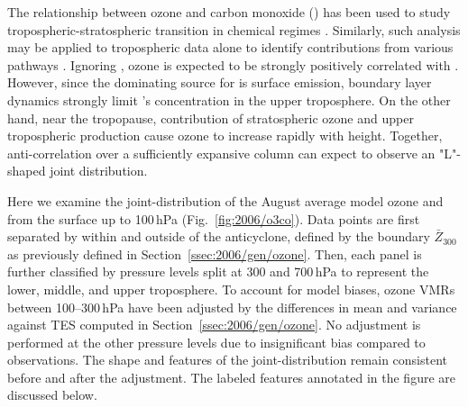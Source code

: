 The relationship between ozone and carbon monoxide () has been used to study tropospheric-stratospheric transition in
chemical regimes \citep[e.g.][and references therein]{Pan:2007sw,Hegglin:2009fk}. Similarly, such analysis may be applied to tropospheric data
alone to identify contributions from various pathways \citep[e.g.][]{Zhang:2006zr,Voulgarakis:2011fk,Cristofanelli:2013uq}. Ignoring
, ozone is expected to be strongly positively correlated with  \citep[][, see also Ch.~\ref{ch:introduction}]{Chin:1994kx}. However, since the dominating
source for  is surface emission, boundary layer dynamics strongly limit 's concentration in the upper troposphere.
On the other hand, near the tropopause, contribution of stratospheric ozone and upper tropospheric production cause ozone to
increase rapidly with height. Together,  anti-correlation over a sufficiently expansive column can expect to observe
an "L"-shaped joint distribution.

Here we examine the joint-distribution of the August average model ozone and  from the surface up to 100\,\unit{hPa} (Fig.~\ref{fig:2006/o3co}).
Data points are first separated by within and outside of the anticyclone, defined by the boundary $\bar{Z}_{300}$ as previously
defined in Section~\ref{ssec:2006/gen/ozone}. Then, each panel is further classified by pressure levels split at 300 and 700\,\unit{hPa}
to represent the lower, middle, and upper troposphere. To account for model biases, ozone VMRs between 100--300\,\unit{hPa}
have been adjusted by the differences in mean and variance against TES computed in Section~\ref{ssec:2006/gen/ozone}. No
adjustment is performed at the other pressure levels due to insignificant bias compared to observations.
The shape and features of the joint-distribution remain consistent before and after the adjustment. The labeled features annotated
in the figure are discussed below.

